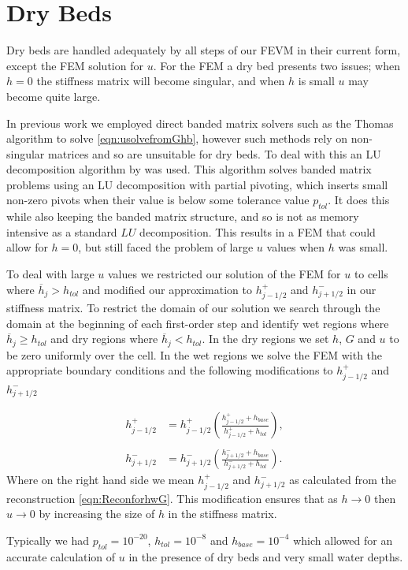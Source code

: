 \section{Dry Beds}
Dry beds are handled adequately by all steps of our FEVM in their current form, except the FEM solution for $u$. For the FEM a dry bed presents two issues; when $h=0$ the stiffness matrix will become singular, and when $h$ is small $u$ may become quite large. 

In previous work \cite{Zoppou-etal-2017} we employed direct banded matrix solvers such as the Thomas algorithm to solve \eqref{eqn:usolvefromGhb}, however such methods rely on non-singular matrices and so are unsuitable for dry beds. To deal with this an LU decomposition algorithm by \citet{NumRecC-1996} was used. This algorithm solves banded matrix problems using an LU decomposition with partial pivoting, which inserts small non-zero pivots when their value is below some tolerance value $p_{tol}$. It does this while also keeping the banded matrix structure, and so is not as memory intensive as a standard $LU$ decomposition. This results in a FEM that could allow for $h=0$, but still faced the problem of large $u$ values when $h$ was small. 

To deal with large $u$ values we restricted our solution of the FEM for $u$ to cells where $\overline{h}_j> h_{tol}$ and modified our approximation to $h^+_{j-1/2}$ and $h^-_{j+1/2}$ in our stiffness matrix. To restrict the domain of our solution we search through the domain at the beginning of each first-order step and identify  wet regions where $\overline{h}_j \ge h_{tol}$ and dry regions where $\overline{h}_j < h_{tol}$. In the dry regions we set $h$, $G$ and $u$ to be zero uniformly over the cell. In the wet regions we solve the FEM with the appropriate boundary conditions and the following modifications to $h^+_{j-1/2}$ and $h^-_{j+1/2}$

\begin{subequations}
\begin{align}
h^+_{j-1/2} & = h^+_{j-1/2} \left(\frac{ h^+_{j-1/2}  + h_{base}}{h^+_{j-1/2} + h_{tol}}\right) , \\ \nonumber\\
h^-_{j+1/2} & = h^-_{j+1/2} \left(\frac{ h^-_{j+1/2}  + h_{base}}{h^-_{j+1/2} + h_{tol}}\right).
\end{align} 
\end{subequations}
Where on the right hand side we mean $h^+_{j-1/2}$ and $h^-_{j+1/2}$ as calculated from the reconstruction \eqref{eqn:ReconforhwG}. This modification ensures that as $h \rightarrow 0$ then $u \rightarrow 0$ by increasing the size of $h$ in the stiffness matrix. 

Typically we had $p_{tol} = 10^{-20}$, $h_{tol} = 10^{-8}$ and $h_{base} = 10^{-4}$ which allowed for an accurate calculation of $u$ in the presence of dry beds and very small water depths.
